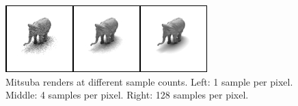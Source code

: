 \documentclass[10pt,twocolumn,letterpaper]{article}
\begin{document}
\begin{figure}[h!]
\centering
\includegraphics[width=1.0\columnwidth]{./assets/mitsuba-onerow.png}
\caption{
Mitsuba renders at different sample counts. Left: 1 sample per pixel.  Middle: 4 samples per pixel.  Right: 128 samples per pixel.}
\label{fig:differentsamplesraw}
\end{figure}

\end{document}
